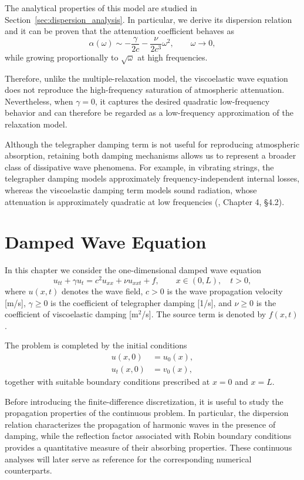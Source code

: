 \documentclass{Configuration_Files/PoliMi3i_thesis}
\begin{document}
The analytical properties of this model are studied in Section~\ref{sec:dispersion_analysis}. In particular, we derive its dispersion relation and it can be proven that the attenuation coefficient behaves as
\begin{equation*}
\alpha(\omega)
\sim
-\frac{\gamma}{2c}
-
\frac{\nu}{2c^3}\omega^2,
\qquad
\omega\rightarrow0,
\end{equation*}
while growing proportionally to $\sqrt{\omega}$ at high frequencies.

Therefore, unlike the multiple-relaxation model, the viscoelastic wave equation does not reproduce the high-frequency saturation of atmospheric attenuation. Nevertheless, when $\gamma=0$, it captures the desired quadratic low-frequency behavior and can therefore be regarded as a low-frequency approximation of the relaxation model.

Although the telegrapher damping term is not useful for reproducing atmospheric absorption, retaining both damping mechanisms allows us to represent a broader class of dissipative wave phenomena. For example, in vibrating strings, the telegrapher damping models approximately frequency-independent internal losses, whereas the viscoelastic damping term models sound radiation, whose attenuation is approximately quadratic at low frequencies (\cite{ruiz_technique_1969}, Chapter 4, §4.2).

\section{Damped Wave Equation}

In this chapter we consider the one-dimensional damped wave equation
\begin{equation} \label{eq:wave}
u_{tt}
+\gamma u_t
=
c^2u_{xx}
+\nu u_{xxt}
+
f,
\qquad
x\in(0,L),\quad t>0,
\end{equation}
where \(u(x,t)\) denotes the wave field, \(c>0\) is the wave propagation velocity [m/s], \(\gamma\ge0\) is the coefficient of telegrapher damping [1/s], and \(\nu\ge0\) is the coefficient of viscoelastic damping [m$^2$/s]. The source term is
denoted by \(f(x,t)\).

The problem is completed by the initial conditions
\begin{align*}
u(x,0)&=u_0(x),\\
u_t(x,0)&=v_0(x),
\end{align*}
together with suitable boundary conditions prescribed at \(x=0\) and \(x=L\).

Before introducing the finite-difference discretization, it is useful to study the propagation properties of the continuous problem. In particular, the dispersion relation characterizes the propagation of harmonic waves in the presence of damping, while the reflection factor associated with Robin boundary conditions provides a quantitative measure of their absorbing properties. These continuous analyses will later serve as reference for the corresponding numerical counterparts.
\end{document}
